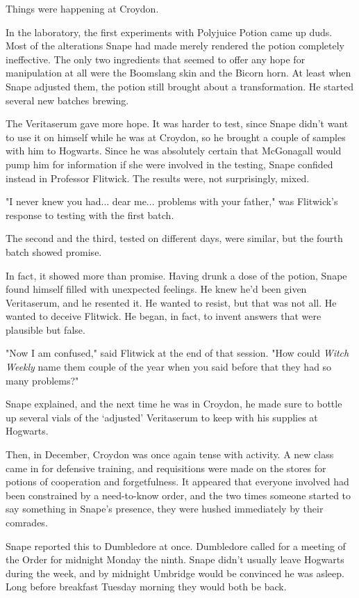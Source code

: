\documentclass[a4paper,11pt]{article}
\begin{document}
Things were happening at Croydon.

In the laboratory, the first experiments with Polyjuice Potion came up duds. Most of the alterations Snape had made merely rendered the potion completely ineffective. The only two ingredients that seemed to offer any hope for manipulation at all were the Boomslang skin and the Bicorn horn. At least when Snape adjusted them, the potion still brought about a transformation. He started several new batches brewing.

The Veritaserum gave more hope. It was harder to test, since Snape didn't want to use it on himself while he was at Croydon, so he brought a couple of samples with him to Hogwarts. Since he was absolutely certain that McGonagall would pump him for information if she were involved in the testing, Snape confided instead in Professor Flitwick. The results were, not surprisingly, mixed.

"I never knew you had... dear me... problems with your father," was Flitwick's response to testing with the first batch.

The second and the third, tested on different days, were similar, but the fourth batch showed promise.

In fact, it showed more than promise. Having drunk a dose of the potion, Snape found himself filled with unexpected feelings. He knew he'd been given Veritaserum, and he resented it. He wanted to resist, but that was not all. He wanted to deceive Flitwick. He began, in fact, to invent answers that were plausible but false.

"Now I am confused," said Flitwick at the end of that session. "How could \emph{Witch Weekly} name them couple of the year when you said before that they had so many problems?"

Snape explained, and the next time he was in Croydon, he made sure to bottle up several vials of the `adjusted' Veritaserum to keep with his supplies at Hogwarts.

Then, in December, Croydon was once again tense with activity. A new class came in for defensive training, and requisitions were made on the stores for potions of cooperation and forgetfulness. It appeared that everyone involved had been constrained by a need-to-know order, and the two times someone started to say something in Snape's presence, they were hushed immediately by their comrades.

Snape reported this to Dumbledore at once. Dumbledore called for a meeting of the Order for midnight Monday the ninth. Snape didn't usually leave Hogwarts during the week, and by midnight Umbridge would be convinced he was asleep. Long before breakfast Tuesday morning they would both be back.
\end{document}
